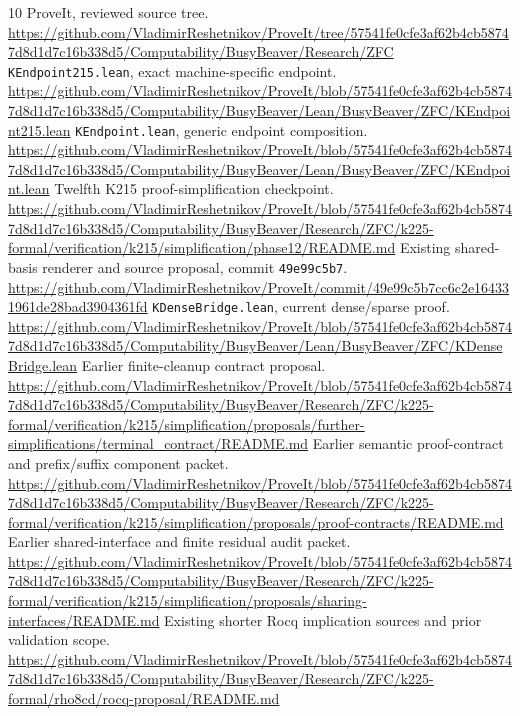 \documentclass[11pt,letterpaper]{article}
\newcommand{\code}[1]{\texttt{#1}}
\begin{document}
\begin{thebibliography}{10}\small
{} ProveIt, reviewed source tree.
\url{https://github.com/VladimirReshetnikov/ProveIt/tree/57541fe0cfe3af62b4cb58747d8d1d7c16b338d5/Computability/BusyBeaver/Research/ZFC}
 \code{KEndpoint215.lean}, exact machine-specific endpoint.
\url{https://github.com/VladimirReshetnikov/ProveIt/blob/57541fe0cfe3af62b4cb58747d8d1d7c16b338d5/Computability/BusyBeaver/Lean/BusyBeaver/ZFC/KEndpoint215.lean}
 \code{KEndpoint.lean}, generic endpoint composition.
\url{https://github.com/VladimirReshetnikov/ProveIt/blob/57541fe0cfe3af62b4cb58747d8d1d7c16b338d5/Computability/BusyBeaver/Lean/BusyBeaver/ZFC/KEndpoint.lean}
 Twelfth K215 proof-simplification checkpoint.
\url{https://github.com/VladimirReshetnikov/ProveIt/blob/57541fe0cfe3af62b4cb58747d8d1d7c16b338d5/Computability/BusyBeaver/Research/ZFC/k225-formal/verification/k215/simplification/phase12/README.md}
 Existing shared-basis renderer and source proposal, commit \code{49e99c5b7}.
\url{https://github.com/VladimirReshetnikov/ProveIt/commit/49e99c5b7cc6c2e164331961de28bad3904361fd}
 \code{KDenseBridge.lean}, current dense/sparse proof.
\url{https://github.com/VladimirReshetnikov/ProveIt/blob/57541fe0cfe3af62b4cb58747d8d1d7c16b338d5/Computability/BusyBeaver/Lean/BusyBeaver/ZFC/KDenseBridge.lean}
 Earlier finite-cleanup contract proposal.
\url{https://github.com/VladimirReshetnikov/ProveIt/blob/57541fe0cfe3af62b4cb58747d8d1d7c16b338d5/Computability/BusyBeaver/Research/ZFC/k225-formal/verification/k215/simplification/proposals/further-simplifications/terminal_contract/README.md}
 Earlier semantic proof-contract and prefix/suffix component packet.
\url{https://github.com/VladimirReshetnikov/ProveIt/blob/57541fe0cfe3af62b4cb58747d8d1d7c16b338d5/Computability/BusyBeaver/Research/ZFC/k225-formal/verification/k215/simplification/proposals/proof-contracts/README.md}
 Earlier shared-interface and finite residual audit packet.
\url{https://github.com/VladimirReshetnikov/ProveIt/blob/57541fe0cfe3af62b4cb58747d8d1d7c16b338d5/Computability/BusyBeaver/Research/ZFC/k225-formal/verification/k215/simplification/proposals/sharing-interfaces/README.md}
 Existing shorter Rocq implication sources and prior validation scope.
\url{https://github.com/VladimirReshetnikov/ProveIt/blob/57541fe0cfe3af62b4cb58747d8d1d7c16b338d5/Computability/BusyBeaver/Research/ZFC/k225-formal/rho8cd/rocq-proposal/README.md}
\end{thebibliography}
\end{document}
